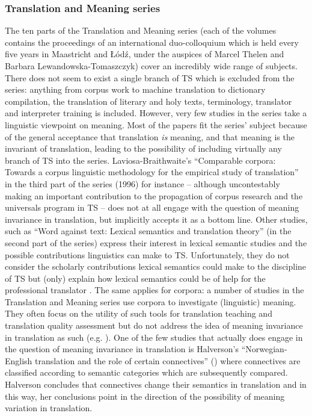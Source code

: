 \subsubsection{Translation and Meaning series}
\label{sec:2.2.3.1}  
The ten parts of the Translation and Meaning series (each of the volumes contains the proceedings of an international duo-colloquium which is held every five years in Maastricht and Łódź, under the auspices of Marcel Thelen and Barbara Lewandowska-Tomaszczyk) cover an incredibly wide range of subjects. There does not seem to exist a single branch of TS which is excluded from the series: anything from corpus work to machine translation to dictionary compilation, the translation of literary and holy texts, terminology, translator and interpreter training is included. However, very few studies in the series take a linguistic viewpoint on meaning. Most of the papers fit the series’ subject because of the general acceptance that translation \textit{is} meaning, and that meaning is the invariant of translation, leading to the possibility of including virtually any branch of TS into the series. Laviosa-Braithwaite’s “Comparable corpora: Towards a corpus linguistic methodology for the empirical study of translation” in the third part of the series (1996) for instance – although uncontestably making an important contribution to the propagation of corpus research and the universals program in TS – does not at all engage with the question of meaning invariance in translation, but implicitly accepts it as a bottom line. Other studies, such as   “Word against text: Lexical semantics and translation theory” (in the second part of the series) express their interest in lexical semantic studies and the possible contributions linguistics can make to TS. Unfortunately, they do not consider the scholarly contributions lexical semantics could make to the discipline of TS but (only) explain how lexical semantics could be of help for the professional translator \citep[100]{lewandowska-tomasczyk_specification_2010}. The same applies for corpora: a number of studies in the Translation and Meaning series use corpora to investigate (linguistic) meaning. They often focus on the utility of such tools for translation teaching and translation quality assessment but do not address the idea of meaning invariance in translation as such (e.g. \citealt{thelen_equivalence_1997,thelen_corpus-based_2007,thelen_semantic_2008}). One of the few studies that actually does engage in the question of meaning invariance in translation is Halverson’s “Norwegian-English translation and the role of certain connectives” (\citeyear{thelen_norwegian-english_1996}) where connectives are classified according to semantic categories which are subsequently compared. Halverson concludes that connectives change their semantics in translation and in this way, her conclusions point in the direction of the possibility of meaning variation in translation.

